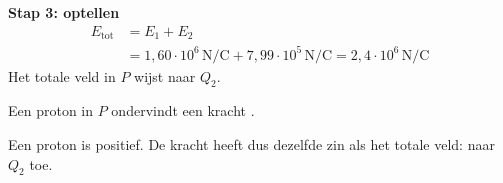 \documentclass{ximera}
\begin{document}
\begin{exercise}
\begin{question}
\begin{solution}
            \textbf{Stap 3: optellen}
            \begin{align*}
                E_{\text{tot}} &= E_1 + E_2 \\
                &= 1{,}60 \cdot 10^{6} \, \mathrm{N/C} + 7{,}99 \cdot 10^{5} \, \mathrm{N/C} = \boxed{2{,}4 \cdot 10^{6} \, \mathrm{N/C}}
            \end{align*}
            Het totale veld in $P$ wijst naar $Q_2$.
        \end{solution}
    \end{question}

    \begin{question}
        Een proton in $P$ ondervindt een kracht
        .

        \begin{solution}\nl
            Een proton is positief. De kracht heeft dus dezelfde zin als het totale veld: naar $Q_2$ toe.
        \end{solution}
    \end{question}
\end{exercise}
\end{document}
